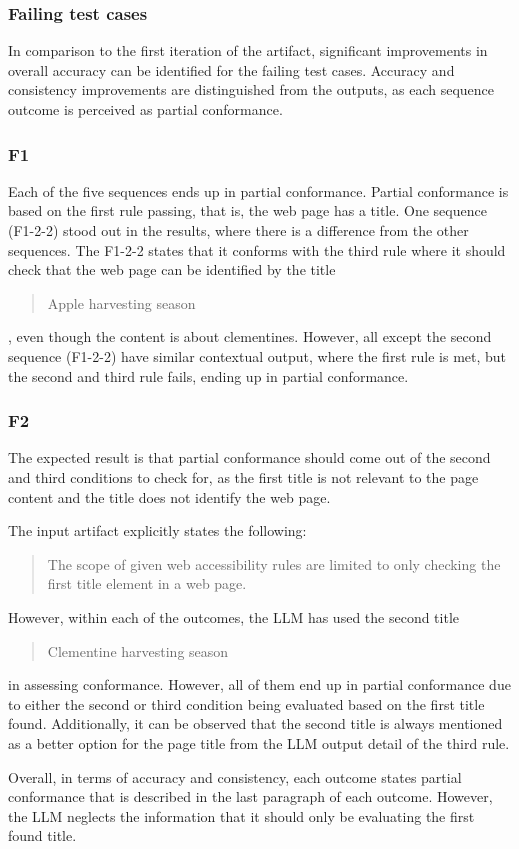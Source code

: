 \subsubsection{Failing test cases}

In comparison to the first iteration of the artifact, significant improvements in overall accuracy can be identified for the failing test cases. Accuracy and consistency improvements are distinguished from the outputs, as each sequence outcome is perceived as partial conformance. 

\subsubsection{F1}

Each of the five sequences ends up in partial conformance. Partial conformance is based on the first rule passing, that is, the web page has a title. One sequence (F1-2-2) stood out in the results, where there is a difference from the other sequences. The F1-2-2 states that it conforms with the third rule where it should check that the web page can be identified by the title \blockquote{Apple harvesting season}, even though the content is about clementines. However, all except the second sequence (F1-2-2) have similar contextual output, where the first rule is met, but the second and third rule fails, ending up in partial conformance.

\subsubsection{F2}

The expected result is that partial conformance should come out of the second and third conditions to check for, as the first title is not relevant to the page content and the title does not identify the web page. 

The input artifact explicitly states the following: \blockquote{The scope of given web accessibility rules are limited to only checking the first title element in a web page.}. However, within each of the outcomes, the LLM has used the second title \blockquote{Clementine harvesting season} in assessing conformance. However, all of them end up in partial conformance due to either the second or third condition being evaluated based on the first title found. Additionally, it can be observed that the second title is always mentioned as a better option for the page title from the LLM output detail of the third rule.

Overall, in terms of accuracy and consistency, each outcome states partial conformance that is described in the last paragraph of each outcome. However, the LLM neglects the information that it should only be evaluating the first found title.

